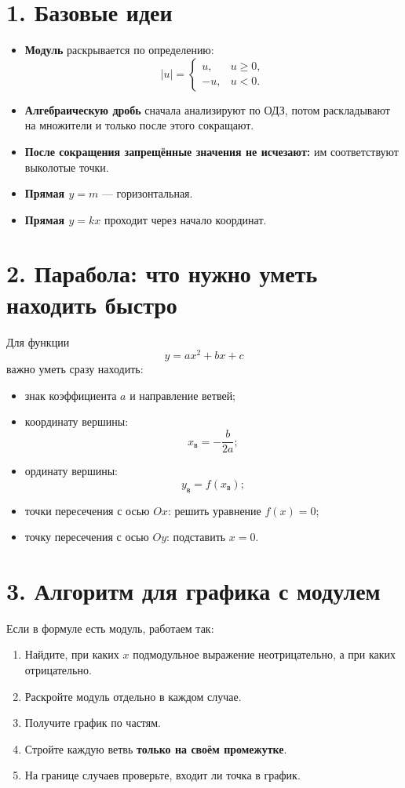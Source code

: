 \documentclass[a4paper,12pt]{article}
\begin{document}
\section*{\textcolor{darkaccent}{1. Базовые идеи}}
\begin{itemize}
	\item \textbf{Модуль} раскрывается по определению:
	\[
	|u|=\begin{cases}
	u, & u\ge 0,\\
	-u, & u<0.
	\end{cases}
	\]
	\item \textbf{Алгебраическую дробь} сначала анализируют по ОДЗ, потом раскладывают на множители и только после этого сокращают.
	\item \textbf{После сокращения запрещённые значения не исчезают:} им соответствуют выколотые точки.
	\item \textbf{Прямая \(y=m\)} --- горизонтальная.
	\item \textbf{Прямая \(y=kx\)} проходит через начало координат.
\end{itemize}

\section*{\textcolor{darkaccent}{2. Парабола: что нужно уметь находить быстро}}
Для функции
\[
y=ax^2+bx+c
\]
важно уметь сразу находить:

\begin{itemize}
	\item знак коэффициента \(a\) и направление ветвей;
	\item координату вершины:
	\[
	x_{\text{в}}=-\frac{b}{2a};
	\]
	\item ординату вершины:
	\[
	y_{\text{в}}=f\!\left(x_{\text{в}}\right);
	\]
	\item точки пересечения с осью \(Ox\): решить уравнение \(f(x)=0\);
	\item точку пересечения с осью \(Oy\): подставить \(x=0\).
\end{itemize}

\section*{\textcolor{darkaccent}{3. Алгоритм для графика с модулем}}
Если в формуле есть модуль, работаем так:

\begin{enumerate}
	\item Найдите, при каких \(x\) подмодульное выражение неотрицательно, а при каких отрицательно.
	\item Раскройте модуль отдельно в каждом случае.
	\item Получите график по частям.
	\item Стройте каждую ветвь \textbf{только на своём промежутке}.
	\item На границе случаев проверьте, входит ли точка в график.
\end{enumerate}
\end{document}
